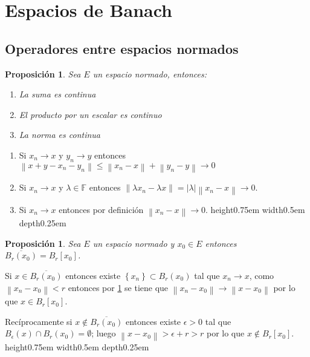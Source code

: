 \documentclass[11pt]{article}
\newcommand{\norm}[1]{\left\lVert#1\right\rVert}
\newcommand{\abs}[1]{\left\lvert#1\right\rvert}
\newcommand{\sett}[1]{\left\lbrace#1\right\rbrace}
\numberwithin{theorem}{subsection}
\newtheorem{proposition}[theorem]{Proposici\'on}
\newenvironment{proof}[1][Demostraci\'on]{\begin{trivlist}
		\item[\hskip \labelsep {\bfseries #1}]}{\end{trivlist}}
\newcommand{\qed}{\nobreak \ifvmode \relax \else
	\ifdim\lastskip<1.5em \hskip-\lastskip
	\hskip1.5em plus0em minus0.5em \fi \nobreak
	\vrule height0.75em width0.5em depth0.25em\fi}
\begin{document}
\section{Espacios de Banach}

\subsection{Operadores entre espacios normados}

\begin{proposition}
	\label{La norma es continua}
	Sea $E$ un espacio normado, entonces:
	
	\begin{enumerate}
		\item La suma es continua
		\item El producto por un escalar es continuo
		\item La norma es continua
	\end{enumerate}
\end{proposition}

\begin{proof}
	\begin{enumerate}
		\item Si $x_n \rightarrow x$ y $y_n \rightarrow y$ entonces $\norm{x+y - x_n - y_n} \leq \norm{x_n -x} + \norm{y_n -y} \rightarrow 0$
		\item Si $x_n \rightarrow x$ y $\lambda \in \mathbb{F}$ entonces $\norm{\lambda x_n - \lambda x} = \abs{\lambda} \norm{x_n - x} \rightarrow 0$.
		\item Si $x_n \rightarrow x$ entonces por definici\'on $\norm{x_n -x} \rightarrow 0$. \qed
	\end{enumerate}
\end{proof}

\begin{proposition}
	Sea $E$ un espacio normado y $x_0 \in E$ entonces $\overline{B_r(x_0)} = B_r[x_0]$.
\end{proposition}

\begin{proof}
	Si $x \in \overline{B_r(x_0)}$ entonces existe $\sett{x_n} \subset B_r(x_0)$ tal que $x_n \rightarrow x$, como $\norm{x_n - x_0} < r$ entonces por \ref{La norma es continua} se tiene que $\norm{x_n - x_0} \rightarrow \norm{x - x_0}$ por lo que $x \in B_r[x_0]$.
	
	Rec\'iprocamente si $x \not \in \overline{B_r(x_0)}$ entonces existe $\epsilon > 0$ tal que $B_{\epsilon}(x) \cap B_r(x_0) = \emptyset$; luego $\norm{x - x_0} > \epsilon + r > r$ por lo que $x \not \in B_{r}[x_0]$. \qed
\end{proof}
\end{document}
